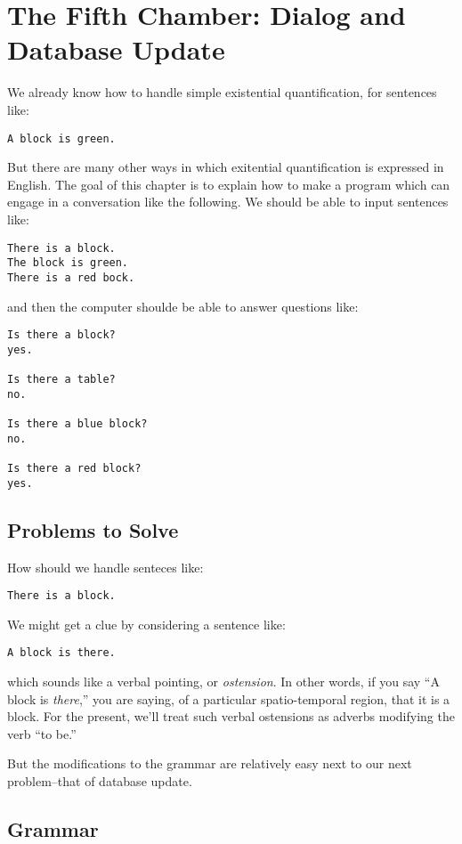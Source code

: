 \documentclass{book}[9pt]
\begin{document}
\chapter{The Fifth Chamber: Dialog and Database Update}

We already know how to handle simple existential quantification, for
sentences like:
\begin{verbatim}
A block is green.
\end{verbatim}
\noindent But there are many other ways in which exitential
quantification is expressed in English.  The goal of this chapter is
to explain how to make a program which can engage in a conversation
like the following.  We should be able to input sentences like:

\begin{verbatim}
There is a block.
The block is green.
There is a red bock.
\end{verbatim}
\noindent and then the computer shoulde be able to answer questions
like:
\begin{verbatim}
Is there a block?
yes.

Is there a table?
no.

Is there a blue block?
no.

Is there a red block?
yes.
\end{verbatim}

\section{Problems to Solve}

How should we handle senteces like:
\begin{verbatim}
There is a block.
\end{verbatim}
\noindent We might get a clue by considering a sentence like:
\begin{verbatim}
A block is there.
\end{verbatim}
\noindent which sounds like a verbal pointing, or {\em ostension}.  In
other words, if you say ``A block is {\em there},'' you are saying, of
a particular spatio-temporal region, that it is a block.  For the
present, we'll treat such verbal ostensions as adverbs modifying the
verb ``to be.''

But the modifications to the grammar are relatively easy next to our
next problem--that of database update.

\section{Grammar}
\end{document}
